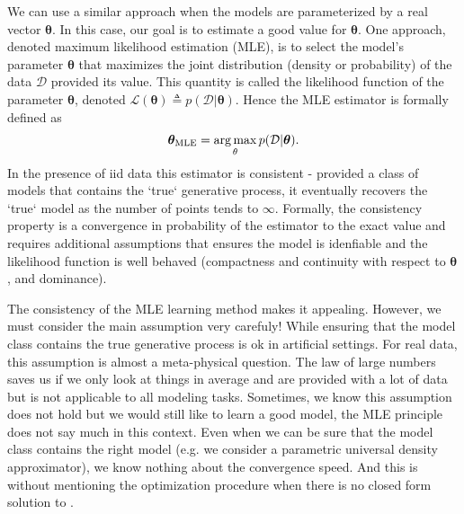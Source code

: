 We can use a similar approach when the models are parameterized by a real vector $\mathbf{\theta}$. In this case, our goal is to estimate a good value for $\mathbf{\theta}$. One approach, denoted maximum likelihood estimation (MLE), is to select the model's parameter $\mathbf{\theta}$ that maximizes the  joint distribution (density or probability) of the data $\mathcal{D}$ provided its value. This quantity is called the likelihood function of the parameter $\mathbf{\theta}$, denoted $\mathcal{L}(\mathbf{\theta}) \triangleq p(\mathcal{D}|\mathbf{\theta})$. Hence the MLE estimator is formally defined as
\begin{align}
   \bm{\theta}_{\text{MLE}} = \operatorname*{arg\,max}_{\theta} p(\mathcal{D}|\bm{\theta}). \label{eq:chap02:MLE}
\end{align}
In the presence of iid data this estimator is consistent - provided a class of models that contains the `true` generative process, it eventually recovers the `true` model as the number of points tends to $\infty$. Formally, the consistency property is a convergence in probability of the estimator to the exact value and requires additional assumptions that ensures the model is idenfiable and the likelihood function is well behaved (compactness and continuity with respect to $\mathbf{\theta}$, and dominance).

The consistency of the MLE learning method makes it appealing. However, we must consider the main assumption very carefuly! While ensuring that the model class contains the true generative process is ok in artificial settings. For real data, this assumption is almost a meta-physical question. The law of large numbers saves us if we only look at things in average and are provided with a lot of data but is not applicable to all modeling tasks. Sometimes, we know this assumption does not hold but we would still like to learn a good model, the MLE principle does not say much in this context. Even when we can be sure that the model class contains the right model (e.g. we consider a parametric universal density approximator), we know nothing about the convergence speed. And this is without mentioning the optimization procedure when there is no closed form solution to .


